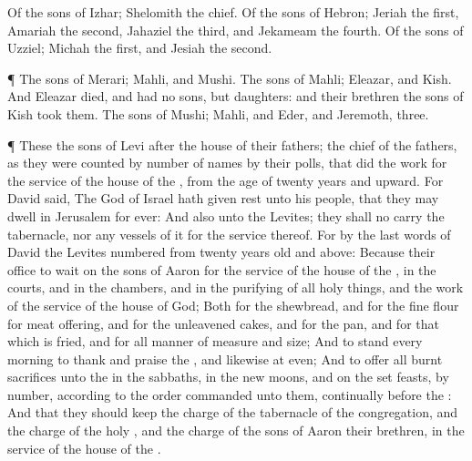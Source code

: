 {Of the
sons of
Izhar;
Shelomith the
chief.
Of the
sons of
Hebron;
Jeriah the
first,
Amariah the
second,
Jahaziel the
third, and
Jekameam the
fourth.
Of the
sons of
Uzziel;
Michah the
first, and
Jesiah the
second.
\par }{\PP {}¶ The
sons of
Merari;
Mahli, and
Mushi. The
sons of
Mahli;
Eleazar, and
Kish.
And
Eleazar
died, and had no
sons, but
daughters: and their
brethren the
sons of
Kish
took them.
The
sons of
Mushi;
Mahli, and
Eder, and
Jeremoth,
three.
\par }{\PP {}¶ These
{} the
sons of
Levi after the
house of their
fathers;
{} the
chief of the
fathers, as they were
counted by
number of
names by their
polls, that
did the
work for the
service of the
house of the
{}, from the
age of
twenty
years and
upward.
For
David
said, The
{}
God of
Israel hath given
rest unto his
people, that they may
dwell in
Jerusalem for
ever:
And also unto the
Levites; they shall no
{}
carry the
tabernacle, nor any
vessels of it for the
service thereof.
For by the
last
words of
David the
Levites
{}
numbered from
twenty
years
old and
above:
Because their
office
{} to
wait on the
sons of
Aaron for the
service of the
house of the
{}, in the
courts, and in the
chambers, and in the
purifying of all holy
things, and the
work of the
service of the
house of
God;
Both for the
shewbread, and for the fine
flour for meat
offering, and for the
unleavened
cakes, and for
{} the
pan, and for that which is
fried, and for all manner of
measure and
size;
And to
stand every
morning to
thank and
praise the
{}, and likewise at
even;
And to
offer all burnt
sacrifices unto the
{} in the
sabbaths, in the new
moons, and on the set
feasts, by
number, according to the
order commanded unto them,
continually
before the
{}:
And that they should
keep the
charge of the
tabernacle of the
congregation, and the
charge of the
holy
{}, and the
charge of the
sons of
Aaron their
brethren, in the
service of the
house of the
{}.

}
